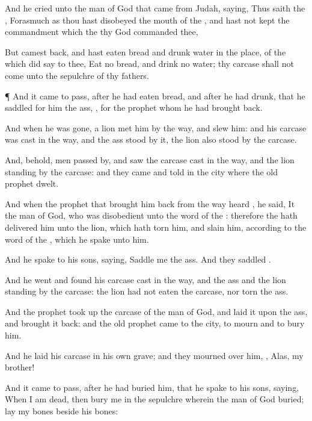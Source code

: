 {And he
cried unto the
man of
God that
came from
Judah,
saying, Thus
saith the
{}, Forasmuch
as thou hast
disobeyed the
mouth of the
{}, and hast not
kept the
commandment which the
{} thy
God
commanded thee,

But camest
back, and hast
eaten
bread and
drunk
water in the
place, of the which
{} did
say to thee,
Eat no
bread, and
drink no
water; thy
carcase shall not
come unto the
sepulchre of thy
fathers.


\par }{\PP {}¶ And it came to pass,
after he had
eaten
bread, and
after he had
drunk, that he
saddled for him the
ass,
{}, for the
prophet whom he had brought
back.

And when he was
gone, a
lion
met him by the
way, and
slew him: and his
carcase was
cast in the
way, and the
ass
stood
by it, the
lion also
stood by the
carcase.

And, behold,
men passed
by, and
saw the
carcase
cast in the
way, and the
lion
standing
by the
carcase: and they
came and
told
{} in the
city where the
old
prophet
dwelt.

And when the
prophet that brought him
back from the
way
heard
{}, he
said, It
{} the
man of
God, who was
disobedient unto the
word of the
{}: therefore the
{} hath
delivered him unto the
lion, which hath
torn him, and
slain him, according to the
word of the
{}, which he
spake unto him.

And he
spake to his
sons,
saying,
Saddle me the
ass. And they
saddled
{}.

And he
went and
found his
carcase
cast in the
way, and the
ass and the
lion
standing
by the
carcase: the
lion had not
eaten the
carcase, nor
torn the
ass.

And the
prophet took
up the
carcase of the
man of
God, and
laid it upon the
ass, and brought it
back: and the
old
prophet
came to the
city, to
mourn and to
bury him.

And he
laid his
carcase in his own
grave; and they
mourned over him,
{},
Alas, my
brother!

And it came to pass,
after he had
buried him, that he
spake to his
sons,
saying, When I am
dead, then
bury me in the
sepulchre wherein the
man of
God
{}
buried;
lay my
bones
beside his
bones:

}
